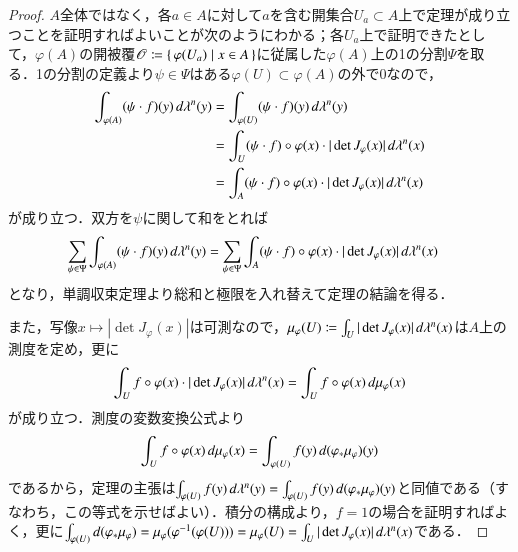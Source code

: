 \begin{proof}$A$全体ではなく，各$a \in A$に対して$a$を含む開集合$U_a \subset A$上で定理が成り立つことを証明すればよいことが次のようにわかる；各$U_a$上で証明できたとして，$\varphi(A)$の開被覆$\mathscr{O} \coloneqq \set{\varphi(U_a) | x \in A}$に従属した$\varphi(A)$上の1の分割$\Psi$を取る．1の分割の定義より$\psi \in \Psi$はある$\varphi(U) \subset \varphi(A)$の外で0なので，
\begin{align}
\int_{\varphi(A)} (\psi \cdot f)(y) \mathop{}\!d\lambda^n(y) &= \int_{\varphi(U)} (\psi \cdot f)(y) \mathop{}\!d\lambda^n(y)\\
&= \int_U (\psi \cdot f) \circ \varphi(x) \cdot | \det J_\varphi(x) | \mathop{}\!d \lambda^n(x) \\
&= \int_A (\psi \cdot f) \circ \varphi(x) \cdot | \det J_\varphi(x) | \mathop{}\!d \lambda^n(x)
\end{align}が成り立つ．双方を$\psi$に関して和をとれば
\begin{align}
\sum_{\psi \in \Psi}\int_{\varphi(A)} (\psi \cdot f)(y) \mathop{}\!d\lambda^n(y) &= \sum_{\psi \in \Psi} \int_A (\psi \cdot f) \circ \varphi(x) \cdot | \det J_\varphi(x) | \mathop{}\!d \lambda^n(x)
\end{align}となり，単調収束定理より総和と極限を入れ替えて定理の結論を得る．

また，写像$x \mapsto |\det J_\varphi(x)|$は可測なので，$\mu_{\varphi}(U) \coloneqq \int_U |\det J_\varphi(x)| \mathop{}\!d \lambda^n(x)$は$A$上の測度を定め，更に
\begin{equation}
\int_U f \circ \varphi(x) \cdot | \det J_\varphi(x) | \mathop{}\!d \lambda^n(x) = \int_U f \circ \varphi(x) \mathop{}\!d \mu_\varphi(x)
\end{equation}
が成り立つ．測度の変数変換公式より
\begin{equation}
\int_U f \circ \varphi(x) \mathop{}\!d \mu_\varphi(x) = \int_{\varphi(U)} f(y) \mathop{}\!d(\varphi_* \mu_\varphi)(y)
\end{equation}
であるから，定理の主張は$\int_{\varphi(U)} f(y) \mathop{}\!d\lambda^n(y) = \int_{\varphi(U)} f(y) \mathop{}\!d(\varphi_* \mu_\varphi)(y)$と同値である（すなわち，この等式を示せばよい）．積分の構成より，$f = 1$の場合を証明すればよく，更に$\int_{\varphi(U)} \mathop{}\!d(\varphi_* \mu_\varphi) = \mu_\varphi(\varphi^{-1}(\varphi(U))) =\mu_\varphi(U)=\int_U |\det J_\varphi(x) |\mathop{}\!d \lambda^n(x)$である．


\end{proof}
